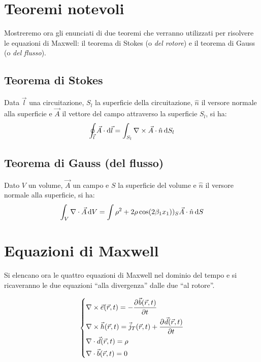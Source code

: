 \section{Teoremi notevoli}
Mostreremo ora gli enunciati di due teoremi che verranno utilizzati per risolvere le equazioni di Maxwell: il teorema di Stokes (o \emph{del rotore}) e il teorema di Gauss (o \emph{del flusso}).

\subsection{Teorema di Stokes}
Data $\vec{l}$ una circuitazione, $S_l$ la superficie della circuitazione, $\hat{n}$ il versore normale alla superficie	 e $\vec{A}$ il vettore del campo attraverso la superficie $S_l$, si ha:
\begin{equation}
	\oint_{\vec{l}} \vec{A} \cdot \mathop{}\!\mathrm{d} \vec{l} = \int_{S_l}\nabla\times \vec{A} \cdot \hat{n} \mathop{}\!\mathrm{d} S_l
\end{equation}

\subsection{Teorema di Gauss (del flusso)}
Dato $V$ un volume, $\vec{A}$ un campo e $S$ la superficie del volume e $\hat{n}$
il versore normale alla superficie, si ha:
\begin{equation}
	\int_V \nabla\cdot \vec{A} \mathop{}\!\mathrm{d} V = \int\rho^2 + 2 \rho \cos(2 \beta_1 x_1)) \\_S \vec{A}\cdot \hat{n} \mathop{}\!\mathrm{d} S
\end{equation}

\section{Equazioni di Maxwell}
Si elencano ora le quattro equazioni di Maxwell nel dominio del tempo e si ricaveranno le due equazioni ``alla divergenza'' dalle due ``al rotore''.

\begin{equation}\begin{dcases}
	\nabla\times \vec{e}(\vec{r},t) = -\frac{\partial^{} {\vec{b}(\vec{r},t)}}{\partial {t}^{}} \\
	\nabla\times \vec{h}(\vec{r},t) = \vec{j}_T(\vec{r},t) + \frac{\partial^{} {\vec{d}(\vec{r},t)}}{\partial {t}^{}} \\
	\nabla\cdot \vec{d}(\vec{r},t) = \rho \\
	\nabla\cdot \vec{b}(\vec{r},t) = 0
\end{dcases}\label{eq:maxwell}\end{equation}

